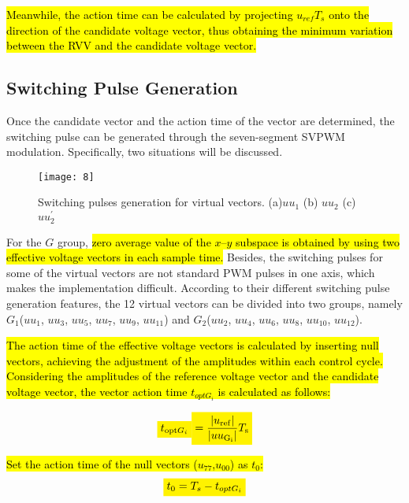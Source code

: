 \documentclass[sn-basic]{sn-jnl}
\newcommand{\mathcolorbox}[2]{\colorbox{#1}{$\displaystyle #2$}}
\theoremstyle{thmstyleone}%
\theoremstyle{thmstyletwo}%
\theoremstyle{thmstylethree}%
\theoremstyle{thmstyleone}%
\begin{document}
\hl{Meanwhile, the action time can be calculated by projecting $u_{ref}$$T_s$ onto the direction of the candidate voltage vector, thus obtaining the minimum variation between the RVV and the candidate voltage vector{\cite{7892874}}. }
\subsection{Switching Pulse Generation}
Once the candidate vector and the action time of the vector are determined, the switching pulse can be generated through the seven-segment SVPWM modulation. Specifically, two situations will be discussed.



\begin{figure}[h]
\centering
\texttt{[image: 8]}
\caption{Switching pulses generation for virtual vectors. (a)\textit{$uu_1$} (b) \textit{$uu_2$} (c) \textit{$uu_{2}^{\prime}$ }       }
\label{fig_8}
\end{figure}
For the $G$ group, \hl{zero average value of the $x–y$ subspace is obtained by using two effective voltage vectors in each sample time.} Besides, the switching pulses for some of the virtual vectors are not standard PWM pulses in one axis, which makes the implementation difficult. According to their different switching pulse generation features, the 12 virtual vectors can be divided into two groups, namely ${{G}_1}$(${{uu}_1}$, ${{uu}_3}$, ${{uu}_5}$, ${{uu}_7}$, ${{uu}_9}$, $uu_{11}$) and ${{G}_2}$(${{uu}_2}$, ${{uu}_4}$, ${{uu}_6}$, ${{uu}_8}$, ${{uu}_{10}}$, ${{uu}_{12}}$).


\hl{The action time of the effective voltage vectors is calculated by inserting null vectors, achieving the adjustment of the amplitudes within each control cycle.
Considering the amplitudes of the reference voltage vector and the candidate voltage vector, the vector action time $t_{{opt}{G_i}}$ is calculated as follows:}

\begin{equation}
\begin{aligned}
\mathcolorbox{yellow}{ t_{\mathrm{opt} {G_i}}}\mathcolorbox{yellow}{=\frac{\left\vert{u_{\mathrm{ref}}}\right\vert}{\left\vert{{uu}_{\mathrm{G_i}}}\right\vert }T_{\mathrm{s}}}
\end{aligned}
\end{equation}

\hl{Set the action time of the null vectors ($u_{77}$,$u_{00}$) as $t_0$:}
\begin{equation}
\mathcolorbox{yellow}{t_{0} = T_{s}-t_{opt{G_i}}}
\label{---}
\end{equation}
\end{document}
